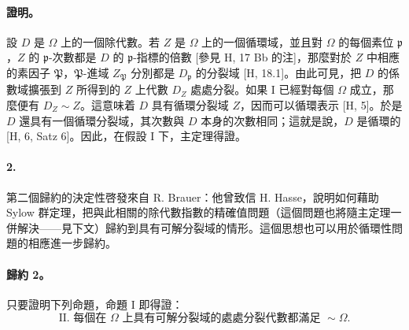 \documentclass[11pt]{article}
\begin{document}
\paragraph{證明。}
設 \(D\) 是 \(\Omega\) 上的一個除代數。若 \(Z\) 是 \(\Omega\) 上的一個循環域，並且對 \(\Omega\) 的每個素位 \(\mathfrak p\)，\(Z\) 的 \(\mathfrak p\)-次數都是 \(D\) 的 \(\mathfrak p\)-指標的倍數 [參見 H, 17 Bb 的注]，那麼對於 \(Z\) 中相應的素因子 \(\mathfrak P\)，\(\mathfrak P\)-進域 \(Z_{\mathfrak P}\) 分別都是 \(D_{\mathfrak p}\) 的分裂域 [H, 18.1]。由此可見，把 \(D\) 的係數域擴張到 \(Z\) 所得到的 \(Z\) 上代數 \(D_Z\) 處處分裂。如果 I 已經對每個 \(\Omega\) 成立，那麼便有 \(D_Z\sim Z\)。這意味着 \(D\) 具有循環分裂域 \(Z\)，因而可以循環表示 [H, 5]。於是 \(D\) 還具有一個循環分裂域，其次數與 \(D\) 本身的次數相同；這就是說，\(D\) 是循環的 [H, 6, Satz 6]。因此，在假設 I 下，主定理得證。

\paragraph{2.}
第二個歸約的決定性啓發來自 R. Brauer：他曾致信 H. Hasse，說明如何藉助 Sylow 群定理，把與此相關的除代數指數的精確值問題（這個問題也將隨主定理一併解決——見下文）歸約到具有可解分裂域的情形。這個思想也可以用於循環性問題的相應進一步歸約。

\paragraph{歸約 2。}
只要證明下列命題，命題 I 即得證：
\[
\text{II. 每個在 }\Omega\text{ 上具有可解分裂域的處處分裂代數都滿足 }\sim\Omega .
\]
\end{document}

